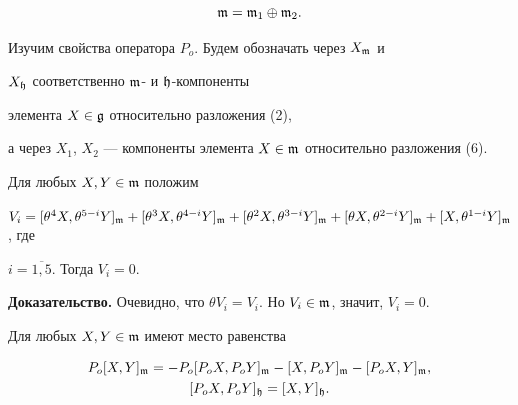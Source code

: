 \begin{equation}\label{6}


\frak{m}= \frak{m}_1 \oplus \frak{m}_2.


\end{equation}


Изучим свойства оператора $P_o$. Будем обозначать через $X_{\frak{m}}$ и


$X_{\frak{h}}$ соответственно $\frak{m}$- и $\frak{h}$-компоненты 


элемента $X \in \frak{g}$ относительно разложения (2),


а через $X_1$, $X_2$ --- компоненты элемента $X \in


\frak{m}$ относительно разложения (6).





\begin{lem}


Для любых $X,Y \in \frak{m}$ положим


$V_i=[\theta^4X,\theta^{5-i}Y]_{\frak{m}}+[\theta^3X,


\theta^{4-i}Y]_{\frak{m}}+[\theta^2X,\theta^{3-i}Y]_{\frak{m}}+[\theta


X,\theta^{2-i}Y]_{\frak{m}}+ [X,\theta^{1-i}Y]_{\frak{m}}$, где


$i=\overline{1,5}$. Тогда $V_i=0$.


\end{lem}





{\bf Доказательство.} Очевидно, что $\theta V_i=V_i$. Но $V_i \in


\frak{m}$, значит, $V_i=0$.





\begin{lem}


Для любых $X,Y \in \frak{m}$ имеют место равенства


\begin{gather}\label{7}


P_o[X,Y]_{\frak{m}}=-P_o[P_oX,P_oY]_{\frak{m}}


-[X,P_oY]_{\frak{m}}-[P_oX,Y]_{\frak{m}}, \\


%


\label{8}


[P_oX,P_oY]_{\frak{h}}=[X,Y]_{\frak{h}}.


\end{gather}


\end{lem}





